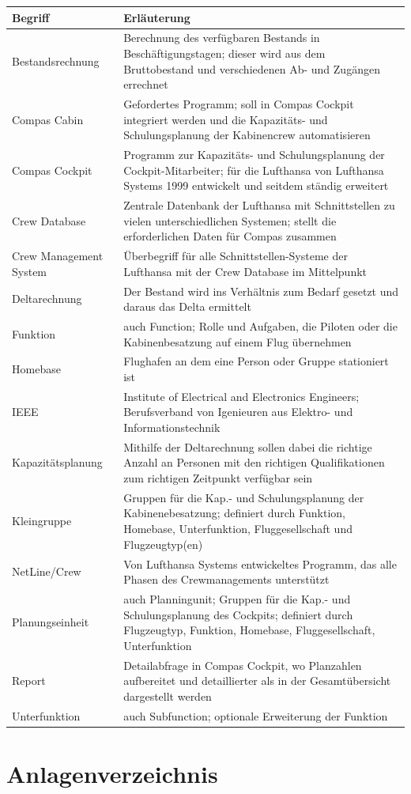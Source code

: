 \documentclass [12pt, a4paper, oneside, titlepage, ngerman]{article}
\begin{document}
\begin{table}[]
\begin{tabular}{l|p{13cm}}
\textbf{Begriff} & \textbf{Erläuterung} \\\hline
Bestandsrechnung & Berechnung des verfügbaren Bestands in Beschäftigungstagen; dieser wird aus dem Bruttobestand und verschiedenen Ab- und Zugängen errechnet\\
Compas Cabin & Gefordertes Programm; soll in Compas Cockpit integriert werden und die Kapazitäts- und Schulungsplanung der Kabinencrew automatisieren\\
Compas Cockpit & Programm zur Kapazitäts- und Schulungsplanung der Cockpit-Mitarbeiter; für die Lufthansa von Lufthansa Systems 1999 entwickelt und seitdem ständig erweitert\\
Crew Database & Zentrale Datenbank der Lufthansa mit Schnittstellen zu vielen unterschiedlichen Systemen; stellt die erforderlichen Daten für Compas zusammen\\
Crew Management System & Überbegriff für alle Schnittstellen-Systeme der Lufthansa mit der Crew Database im Mittelpunkt\\
Deltarechnung & Der Bestand wird ins Verhältnis zum Bedarf gesetzt und daraus das Delta ermittelt\\
Funktion & auch Function; Rolle und Aufgaben, die Piloten oder die Kabinenbesatzung auf einem Flug übernehmen \\
Homebase & Flughafen an dem eine Person oder Gruppe stationiert ist \\  
IEEE & Institute of Electrical and Electronics Engineers; Berufsverband von Igenieuren aus Elektro- und Informationstechnik \\
Kapazitätsplanung & Mithilfe der Deltarechnung sollen dabei die richtige Anzahl an Personen mit den richtigen Qualifikationen zum richtigen Zeitpunkt verfügbar sein\\
Kleingruppe & Gruppen für die Kap.- und Schulungsplanung der Kabinenebesatzung; definiert durch  Funktion, Homebase, Unterfunktion, Fluggesellschaft und Flugzeugtyp(en)\\
NetLine/Crew & Von Lufthansa Systems entwickeltes Programm, das alle Phasen des Crewmanagements unterstützt\\
Planungseinheit & auch Planningunit; Gruppen für die Kap.- und Schulungsplanung des Cockpits; definiert durch Flugzeugtyp, Funktion, Homebase, Fluggesellschaft, Unterfunktion\\
Report & Detailabfrage in Compas Cockpit, wo Planzahlen aufbereitet und detaillierter als in der Gesamtübersicht dargestellt werden\\
Unterfunktion & auch Subfunction; optionale Erweiterung der Funktion \\

\end{tabular}
\end{table}
\newpage

\section* {Anlagenverzeichnis}
\newpage
\end{document}
